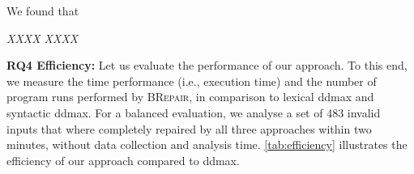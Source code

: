 \documentclass[sigconf,review,anonymous]{acmart}
\newenvironment{result}{\begin{framed}\centering\it}{\end{framed}}
\newcounter{todocounter}
\newcommand{\todo}[1]{\marginpar{$|$}\textcolor{red}{\stepcounter{todocounter}\footnote[\thetodocounter]{\textcolor{red}{\textbf{TODO }}\textit{#1}}}}
\newcommand{\recheck}[1]{\textcolor{red}{#1}}
\renewcommand{\todo}[1]{}
\newcommand{\approach}{\textsc{BRepair}\xspace}
\begin{document}
We found that 

\begin{result}
XXXX
XXXX
\end{result}





\noindent
\textbf{RQ4 Efficiency:}
Let us evaluate the performance of our approach. 
To this end, we measure the time performance (i.e., execution time) and the number of program runs performed 
by \approach, in comparison to lexical ddmax and syntactic ddmax. For a balanced evaluation, we 
analyse a set of 483 invalid inputs %
that where completely repaired by all three approaches within %
two minutes, %
without %
data collection and %
analysis time. 
\autoref{tab:efficiency} %
illustrates the efficiency of our approach compared to ddmax. %

\end{document}
